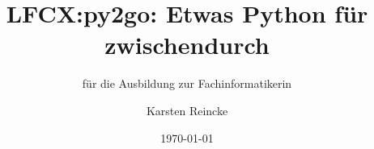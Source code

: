 \documentclass[]{beamer}
\title{LFCX:py2go: Etwas Python für zwischendurch}
\subtitle{für die Ausbildung zur Fachinformatikerin}
\institute[GS-LDK]{Gewerbliche Schulen Dillenburg}
\author{Karsten Reincke}
\date{\today}
\def\cfgGl{../../../cfg.gl/}
\begin{document}

\begin{frame}
  \titlepage

  
\end{frame}






\logo{}
\newpage



%
\end{document}
